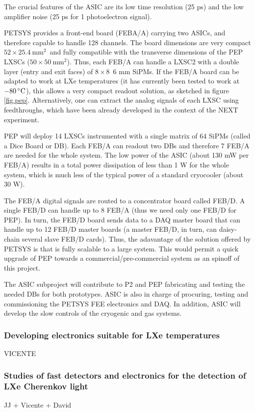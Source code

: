 The crucial features of the ASIC are its low time resolution (25 ps) and the low amplifier noise (25 ps for 1 photoelectron signal).   

PETSYS provides a front-end board (FEBA/A) carrying two ASICs, and therefore capable to handle 128 channels. The board dimensions are very compact $52 \times 25.4 \mathrm{~mm^2}$~and fully compatible with the transverse dimensions of the PEP LXSCs ($50 \times 50 \mathrm{~mm^2}$). Thus, each FEB/A can handle a LXSC2 with a double
layer (entry and exit faces) of $8 \times 8$~6 mm SiPMs. If the FEB/A board can be adapted to work at LXe temperatures (it has currently been tested to work at $-80\,^{\circ}{\rm C}$), this allows a very compact readout solution,
as sketched in figure \ref{fig.pep}. Alternatively, one can extract the analog signals of each LXSC using feedthroughs, which have been already developed in the context of the NEXT experiment. 

PEP will deploy 14 LXSCs instrumented with a single matrix of 64 SiPMs (called a Dice Board or DB). Each FEB/A can readout two DBs and therefore 7 FEB/A are needed for the whole system. The low power of the ASIC (about 130 mW per FEB/A) results in a total power dissipation of less than 1 W for the whole system, which is much less of the typical power of a standard cryocooler (about 30 W). 

The FEB/A digital signals are routed to a concentrator board called FEB/D. A single FEB/D can handle up to 8 FEB/A (thus we need only one FEB/D for PEP). In turn, the FEB/D board sends data to a DAQ master board that can handle up to 12 FEB/D master boards (a master FEB/D, in turn, can daisy-chain several slave FEB/D cards). Thus, the adavantage of the solution offered by PETSYS is that is fully scalable to a large system. This would permit a quick upgrade of PEP towards a commercial/pre-commercial system as an spinoff of this project. 

The ASIC subproject will contribute to P2 and PEP fabricating and testing the needed DBs for both prototypes. ASIC is also in charge of procuring, testing and commissioning the PETSYS FEE electronics and DAQ. In addition, ASIC will develop the slow controls of the cryogenic and gas systems. 

\subsubsection*{Developing electronics suitable for LXe temperatures}

VICENTE

\subsubsection*{Studies of fast detectors and electronics for the detection of LXe Cherenkov light}

JJ + Vicente + David
